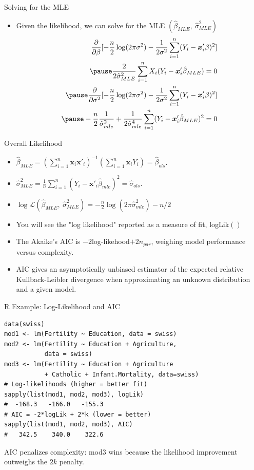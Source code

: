 \documentclass[aspectratio=169, handout, t]{beamer}
\numberwithin{equation}{section}
\begin{document}
\begin{frame}{Solving for the MLE}
\begin{itemize}
\item Given the likelihood, we can solve for the MLE $(\hat{\beta}_{MLE},\ \hat{\sigma}^2_{MLE})$
\begin{align*}
\frac{\partial}{\partial \beta}[-\frac{n}{2}\log(2\pi\sigma^2)-\frac{1}{2\sigma^2}\sum_{i=1}^n(Y_i-\bm{x}_i'\beta)^2]\\\pause
\frac{2}{2\hat{\sigma}_{MLE}^2}\sum_{i=1}^nX_i(Y_i-\bm{x}_i'\hat{\beta}_{MLE})=0\\\pause
\frac{\partial}{\partial \sigma^2}[-\frac{n}{2}\log(2\pi\sigma^2)-\frac{1}{2\sigma^2}\sum_{i=1}^n(Y_i-\bm{x}_i'\beta)^2]\\\pause
-\frac{n}{2}\frac{1}{\hat{\sigma}_{mle}^2}+\frac{1}{2\hat{\sigma}_{mle}^4}\sum_{i=1}^n(Y_i-\bm{x}_i'\hat{\beta}_{MLE})^2=0
\end{align*}
\end{itemize}
\end{frame}

\begin{frame}{Overall Likelihood}
\begin{itemize}
\item $\hat{\beta}_{MLE}=(\sum_{i=1}^n\bm{x}_i\bm{x}'_i)^{-1}(\sum_{i=1}^n\bm{x}_iY_i)=\hat{\beta}_{ols}$.\pause
\item $\hat{\sigma}^2_{MLE}=\frac{1}{n}\sum_{i=1}^n(Y_i-\bm{x}'_i\hat{\beta}_{mle})^{2}=\hat{\sigma}_{ols}$.\pause
\item $\log\mathcal{L}(\hat{\beta}_{MLE},\ \hat{\sigma}^2_{MLE})=-\frac{n}{2}\log(2\pi \hat{\sigma}^2_{mle})-n/2$\pause
\item You will see the "log likelihood" reported as a measure of fit, logLik$()$\pause
\item The Akaike's AIC is $-2$log-likehood$+2n_{par}$, weighing model performance versus complexity.\pause
\item AIC gives an asymptotically unbiased estimator of the expected relative Kullback-Leibler divergence when approximating an unknown distribution and a given model.
\end{itemize}
\end{frame}

\begin{frame}[fragile]{R Example: Log-Likelihood and AIC}
\begin{lstlisting}[style=Rstyle]
data(swiss)
mod1 <- lm(Fertility ~ Education, data = swiss)
mod2 <- lm(Fertility ~ Education + Agriculture,
           data = swiss)
mod3 <- lm(Fertility ~ Education + Agriculture
           + Catholic + Infant.Mortality, data=swiss)
# Log-likelihoods (higher = better fit)
sapply(list(mod1, mod2, mod3), logLik)
#  -168.3   -166.0   -155.3
# AIC = -2*logLik + 2*k (lower = better)
sapply(list(mod1, mod2, mod3), AIC)
#   342.5    340.0    322.6
\end{lstlisting}
\smallskip
AIC penalizes complexity: mod3 wins because the likelihood improvement outweighs the $2k$ penalty.
\end{frame}
\end{document}

